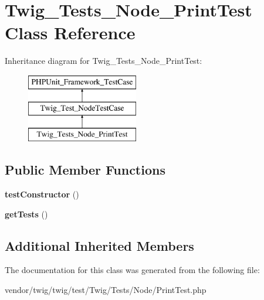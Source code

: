\hypertarget{classTwig__Tests__Node__PrintTest}{}\section{Twig\+\_\+\+Tests\+\_\+\+Node\+\_\+\+Print\+Test Class Reference}
\label{classTwig__Tests__Node__PrintTest}
Inheritance diagram for Twig\+\_\+\+Tests\+\_\+\+Node\+\_\+\+Print\+Test\+:\begin{figure}[H]
\begin{center}
\leavevmode
\includegraphics[height=3.000000cm]{classTwig__Tests__Node__PrintTest}
\end{center}
\end{figure}
\subsection*{Public Member Functions}
\begin{DoxyCompactItemize}
\item 
{\bfseries test\+Constructor} ()\hypertarget{classTwig__Tests__Node__PrintTest_a5be64b854254cfcd3f4bba8e6a8e907d}{}\label{classTwig__Tests__Node__PrintTest_a5be64b854254cfcd3f4bba8e6a8e907d}

\item 
{\bfseries get\+Tests} ()\hypertarget{classTwig__Tests__Node__PrintTest_a63e2d5a4221878c3350f241cfac04539}{}\label{classTwig__Tests__Node__PrintTest_a63e2d5a4221878c3350f241cfac04539}

\end{DoxyCompactItemize}
\subsection*{Additional Inherited Members}


The documentation for this class was generated from the following file\+:\begin{DoxyCompactItemize}
\item 
vendor/twig/twig/test/\+Twig/\+Tests/\+Node/Print\+Test.\+php\end{DoxyCompactItemize}
